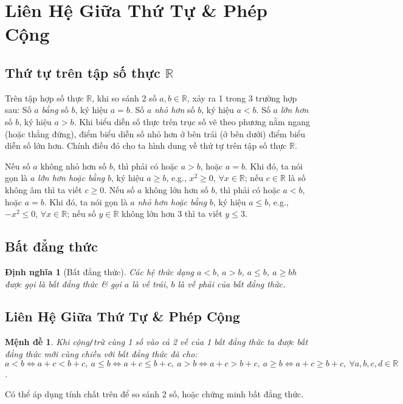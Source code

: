 \documentclass{article}
\newtheorem{dinhnghia}{Định nghĩa}
\newtheorem{menhde}{Mệnh đề}
\begin{document}
\section{Liên Hệ Giữa Thứ Tự \& Phép Cộng}

\subsection{Thứ tự trên tập số thực $\mathbb{R}$}
Trên tập hợp số thực $\mathbb{R}$, khi so sánh 2 số $a,b\in\mathbb{R}$, xảy ra 1 trong 3 trường hợp sau: Số $a$ \textit{bằng} số $b$, ký hiệu $a = b$. Số $a$ \textit{nhỏ hơn} số $b$, ký hiệu $a < b$. Số $a$ \textit{lớn hơn} số $b$, ký hiệu $a > b$. Khi biểu diễn số thực trên trục số vẽ theo phương nằm ngang (hoặc thẳng đứng), điểm biểu diễn số nhỏ hơn ở bên trái (ở bên dưới) điểm biểu diễn số lớn hơn. Chính điều đó cho ta hình dung về thứ tự trên tập số thực $\mathbb{R}$.

Nếu số $a$ không nhỏ hơn số $b$, thì phải có hoặc $a > b$, hoặc $a = b$. Khi đó, ta nói gọn là $a$ \textit{lớn hơn hoặc bằng} $b$, ký hiệu $a\ge b$, e.g., $x^2\ge0$, $\forall x\in\mathbb{R}$; nếu $c\in\mathbb{R}$ là số không âm thì ta viết $c\ge0$. Nếu số $a$ không lớn hơn số $b$, thì phải có hoặc $a < b$, hoặc $a = b$. Khi đó, ta nói gọn là $a$ \textit{nhỏ hơn hoặc bằng} $b$, ký hiệu $a\le b$, e.g., $-x^2\le0$, $\forall x\in\mathbb{R}$; nếu số $y\in\mathbb{R}$ không lớn hơn $3$ thì ta viết $y\le3$.

\subsection{Bất đẳng thức}

\begin{dinhnghia}[Bất đẳng thức]
	Các hệ thức dạng $a < b$, $a > b$, $a\le b$, $a\ge b$h được gọi là \emph{bất đẳng thức} \& gọi $a$ là \emph{vế trái}, $b$ là \emph{vế phải} của bất đẳng thức.
\end{dinhnghia}

\subsection{Liên Hệ Giữa Thứ Tự \& Phép Cộng}

\begin{menhde}
	Khi cộng\emph{\texttt{/}}trừ cùng 1 số vào cả 2 vế của 1 bất đẳng thức ta được bất đẳng thức mới cùng chiều với bất đẳng thức đã cho: $a < b\Leftrightarrow a + c < b + c,\ a\le b\Leftrightarrow a + c\le b + c,\ a > b\Leftrightarrow a + c > b + c,\ a\ge b\Leftrightarrow a + c\ge b + c,\ \forall a,b,c,d\in\mathbb{R}$.
\end{menhde}
Có thể áp dụng tính chất trên để so sánh 2 số, hoặc chứng minh bất đẳng thức.
\end{document}
